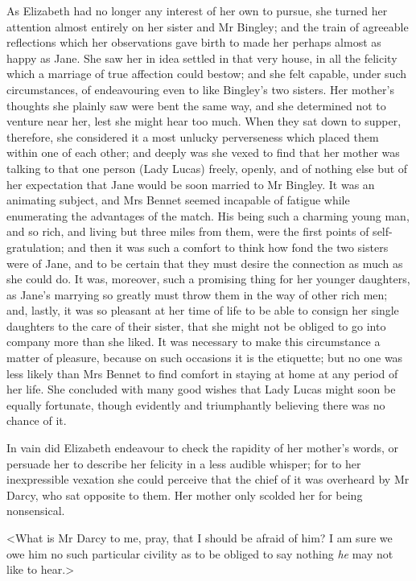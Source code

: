 As Elizabeth had no longer any interest of her own to pursue, she turned her attention almost entirely on her sister and Mr Bingley; and the train of agreeable reflections which her observations gave birth to made her perhaps almost as happy as Jane. She saw her in idea settled in that very house, in all the felicity which a marriage of true affection could bestow; and she felt capable, under such circumstances, of endeavouring even to like Bingley's two sisters. Her mother's thoughts she plainly saw were bent the same way, and she determined not to venture near her, lest she might hear too much. When they sat down to supper, therefore, she considered it a most unlucky perverseness which placed them within one of each other; and deeply was she vexed to find that her mother was talking to that one person (Lady Lucas) freely, openly, and of nothing else but of her expectation that Jane would be soon married to Mr Bingley. It was an animating subject, and Mrs Bennet seemed incapable of fatigue while enumerating the advantages of the match. His being such a charming young man, and so rich, and living but three miles from them, were the first points of self-gratulation; and then it was such a comfort to think how fond the two sisters were of Jane, and to be certain that they must desire the connection as much as she could do. It was, more\-over, such a promising thing for her younger daughters, as Jane's marrying so greatly must throw them in the way of other rich men; and, lastly, it was so pleasant at her time of life to be able to consign her single daughters to the care of their sister, that she might not be obliged to go into company more than she liked. It was necessary to make this circumstance a matter of pleasure, because on such occasions it is the etiquette; but no one was less likely than Mrs Bennet to find comfort in staying at home at any period of her life. She concluded with many good wishes that Lady Lucas might soon be equally fortunate, though evidently and triumphantly believing there was no chance of it.

In vain did Elizabeth endeavour to check the rapidity of her mother's words, or persuade her to describe her felicity in a less audible whisper; for to her inexpressible vexation she could perceive that the chief of it was overheard by Mr Darcy, who sat opposite to them. Her mother only scolded her for being nonsensical.

<What is Mr Darcy to me, pray, that I should be afraid of him? I am sure we owe him no such particular civility as to be obliged to say nothing \textit{he} may not like to hear.>

